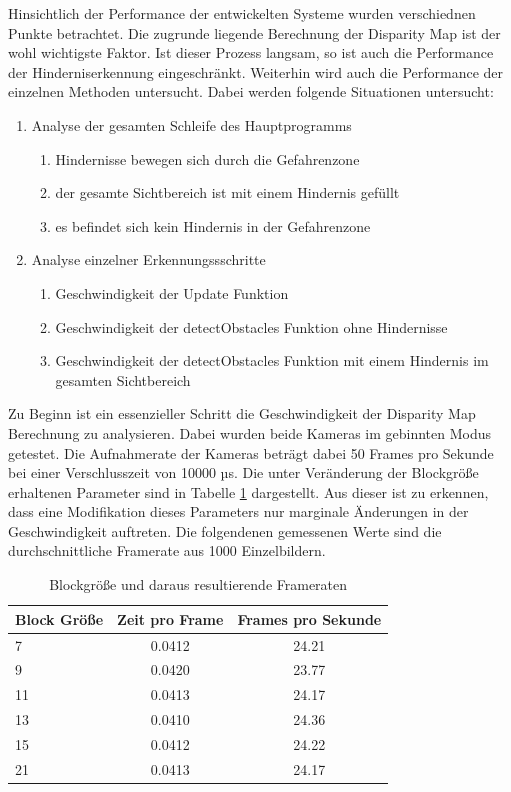 Hinsichtlich der Performance der entwickelten Systeme wurden verschiednen Punkte betrachtet. Die zugrunde liegende Berechnung der Disparity Map ist der wohl wichtigste Faktor. Ist dieser Prozess langsam, so ist auch die Performance der Hinderniserkennung eingeschränkt. Weiterhin wird auch die Performance der einzelnen Methoden untersucht. Dabei werden folgende Situationen untersucht:
\begin{enumerate}
	\item Analyse der gesamten Schleife des Hauptprogramms
	\begin{enumerate}
		\item Hindernisse bewegen sich durch die Gefahrenzone
		\item der gesamte Sichtbereich ist mit einem Hindernis gefüllt
		\item es befindet sich kein Hindernis in der Gefahrenzone
	\end{enumerate}
	\item Analyse einzelner Erkennungssschritte
	\begin{enumerate}
		\item Geschwindigkeit der Update Funktion
		\item Geschwindigkeit der detectObstacles Funktion ohne Hindernisse
		\item Geschwindigkeit der detectObstacles Funktion mit einem Hindernis im gesamten Sichtbereich
	\end{enumerate}
\end{enumerate}

\noindent
Zu Beginn ist ein essenzieller Schritt die Geschwindigkeit der Disparity Map Berechnung zu analysieren. Dabei wurden beide Kameras im gebinnten Modus getestet. Die Aufnahmerate der Kameras beträgt dabei 50 Frames pro Sekunde bei einer Verschlusszeit von 10000 µs. Die unter Veränderung der Blockgröße erhaltenen Parameter sind in Tabelle \ref{tbl:disparity_framerate} dargestellt. Aus dieser ist zu erkennen, dass eine Modifikation dieses Parameters nur marginale Änderungen in der Geschwindigkeit auftreten. Die folgendenen gemessenen Werte sind die durchschnittliche Framerate aus 1000 Einzelbildern.

\begin{table}[h]
	\centering
	\begin{tabular}{|l|c|c|}
	\hline
	Block Größe & Zeit pro Frame & Frames pro Sekunde \\ \hline
	7           & 0.0412         & 24.21              \\ \hline
	9           & 0.0420         & 23.77              \\ \hline
	11          & 0.0413         & 24.17              \\ \hline
	13          & 0.0410         & 24.36              \\ \hline
	15          & 0.0412         & 24.22              \\ \hline
	21          & 0.0413         & 24.17              \\ \hline
	\end{tabular}
	\caption{Blockgröße und daraus resultierende Frameraten}
	\label{tbl:disparity_framerate}
\end{table}

